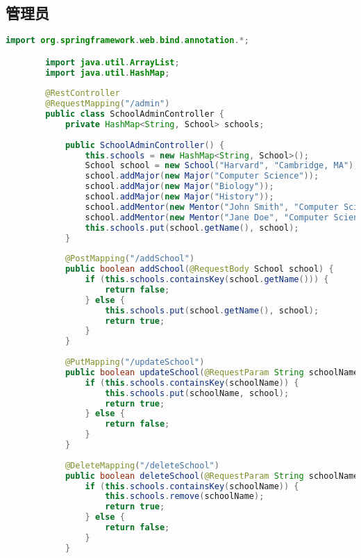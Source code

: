 \documentclass[UTF8]{ctexart}
\begin{document}
    \subsection{管理员}
    \begin{lstlisting}[language=java]
        import org.springframework.web.bind.annotation.*;

        import java.util.ArrayList;
        import java.util.HashMap;
        
        @RestController
        @RequestMapping("/admin")
        public class SchoolAdminController {
            private HashMap<String, School> schools;
        
            public SchoolAdminController() {
                this.schools = new HashMap<String, School>();
                School school = new School("Harvard", "Cambridge, MA");
                school.addMajor(new Major("Computer Science"));
                school.addMajor(new Major("Biology"));
                school.addMajor(new Major("History"));
                school.addMentor(new Mentor("John Smith", "Computer Science", "Professor"));
                school.addMentor(new Mentor("Jane Doe", "Computer Science", "Associate Professor"));
                this.schools.put(school.getName(), school);
            }
        
            @PostMapping("/addSchool")
            public boolean addSchool(@RequestBody School school) {
                if (this.schools.containsKey(school.getName())) {
                    return false;
                } else {
                    this.schools.put(school.getName(), school);
                    return true;
                }
            }
        
            @PutMapping("/updateSchool")
            public boolean updateSchool(@RequestParam String schoolName, @RequestBody School school) {
                if (this.schools.containsKey(schoolName)) {
                    this.schools.put(schoolName, school);
                    return true;
                } else {
                    return false;
                }
            }
        
            @DeleteMapping("/deleteSchool")
            public boolean deleteSchool(@RequestParam String schoolName) {
                if (this.schools.containsKey(schoolName)) {
                    this.schools.remove(schoolName);
                    return true;
                } else {
                    return false;
                }
            }
        

\end{lstlisting}
\end{document}
